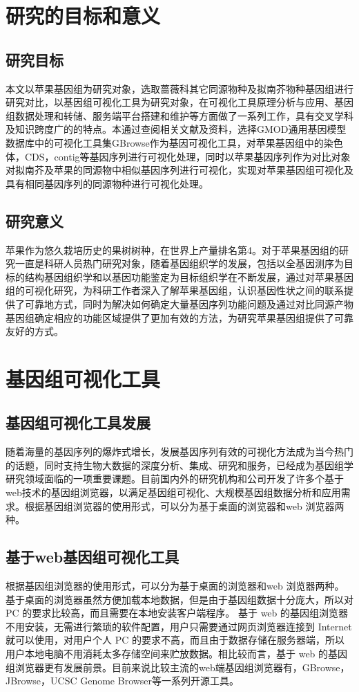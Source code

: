	\section{研究的目标和意义}
		\subsection{研究目标}
		本文以苹果基因组为研究对象，选取蔷薇科其它同源物种及拟南芥物种基因组进行研究对比，以基因组可视化工具为研究对象，在可视化工具原理分析与应用、基因组数据处理和转储、服务端平台搭建和维护等方面做了一系列工作，具有交叉学科及知识跨度广的的特点。本通过查阅相关文献及资料，选择GMOD通用基因模型数据库中的可视化工具集GBrowse作为基因可视化工具，对苹果基因组中的染色体，CDS，contig等基因序列进行可视化处理，同时以苹果基因序列作为对比对象对拟南芥及苹果的同源物中相似基因序列进行可视化，实现对苹果基因组可视化及具有相同基因序列的同源物种进行可视化处理。
		\subsection{研究意义}
		苹果作为悠久栽培历史的果树树种，在世界上产量排名第4。对于苹果基因组的研究一直是科研人员热门研究对象，随着基因组织学的发展，包括以全基因测序为目标的结构基因组织学和以基因功能鉴定为目标组织学在不断发展，通过对苹果基因组的可视化研究，为科研工作者深入了解苹果基因组，认识基因性状之间的联系提供了可靠地方式，同时为解决如何确定大量基因序列功能问题及通过对比同源产物基因组确定相应的功能区域提供了更加有效的方法，为研究苹果基因组提供了可靠友好的方式。
	\section{基因组可视化工具}
		\subsection{基因组可视化工具发展}
		随着海量的基因序列的爆炸式增长，发展基因序列有效的可视化方法成为当今热门的话题，同时支持生物大数据的深度分析、集成、研究和服务，已经成为基因组学研究领域面临的一项重要课题。目前国内外的研究机构和公司开发了许多个基于web技术的基因组浏览器，以满足基因组可视化、大规模基因组数据分析和应用需求。根据基因组浏览器的使用形式，可以分为基于桌面的浏览器和web 浏览器两种。
		\subsection{基于web基因组可视化工具}
		根据基因组浏览器的使用形式，可以分为基于桌面的浏览器和web 浏览器两种。基于桌面的浏览器虽然方便加载本地数据，但是由于基因组数据十分庞大，所以对PC 的要求比较高，而且需要在本地安装客户端程序。 基于 web 的基因组浏览器不用安装，无需进行繁琐的软件配置，用户只需要通过网页浏览器连接到 Internet 就可以使用，对用户个人 PC 的要求不高，而且由于数据存储在服务器端，所以用户本地电脑不用消耗太多存储空间来贮放数据。相比较而言，基于 web 的基因组浏览器更有发展前景。目前来说比较主流的web端基因组浏览器有，GBrowse，JBrowse，UCSC Genome Browser等一系列开源工具。

